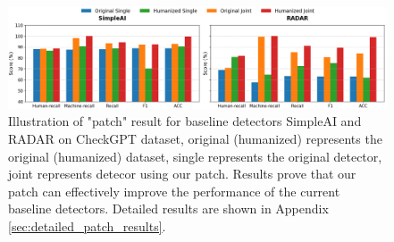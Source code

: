 \documentclass[11pt]{article}
\begin{document}
			\begin{figure}
				\centering
				\includegraphics[width=0.9\linewidth]{pics/two-patch.png}
				\caption{Illustration of "patch" result for baseline detectors SimpleAI and RADAR on CheckGPT dataset, original (humanized) represents the original (humanized) dataset, single represents the original detector, joint represents detecor using our patch. Results prove that our patch can effectively improve the performance of the current baseline detectors. Detailed results are shown in Appendix \ref{sec:detailed_patch_results}.}
		\label{pic:patch_result}
		\end{figure}
\end{document}
